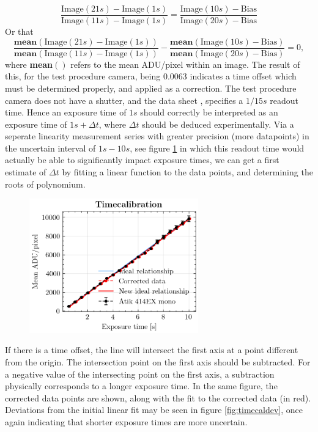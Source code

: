 \documentclass[../main.tex]{subfiles}
\begin{document}
	\begin{equation}
		\frac{\text{Image}(21s) - \text{Image}(1s)}{\text{Image}(11s) - \text{Image}(1s)} = \frac{\text{Image}(10s) - \text{Bias}}{\text{Image}(20s) - \text{Bias}}
	\end{equation}
	Or that 
	\begin{equation}
		\frac{\textbf{mean}(\text{Image}(21s) - \text{Image}(1s))}{\textbf{mean}(\text{Image}(11s) - \text{Image}(1s))} - \frac{\textbf{mean}(\text{Image}(10s) - \text{Bias})}{\textbf{mean}(\text{Image}(20s) - \text{Bias})} = 0,
	\end{equation}
	where \textbf{mean}$()$ refers to the mean ADU/pixel within an image. The result of this, for the test procedure camera, being $0.0063$ indicates a time offset which must be determined properly, and applied as a correction. The test procedure camera does not have a shutter, and the data sheet \cite{atik414specs}, specifies a $1/15 s$ readout time. Hence an exposure time of $1s$ should correctly be interpreted as an exposure time of $1s + \Delta t$, where $\Delta t$ should be deduced experimentally. Via a seperate linearity measurement series with greater precision (more datapoints) in the uncertain interval of $1s - 10s$, see figure \ref{fig:timecal} in which this readout time would actually be able to significantly impact exposure times, we can get a first estimate of $\Delta t$ by fitting a linear function to the data points, and determining the roots of polynomium. 
	\begin{figure}
		\centering			\includegraphics[width=0.65\textwidth]{time_calibration.png}
		\caption{}
		\label{fig:timecal}
	\end{figure}
	If there is a time offset, the line will intersect the first axis at a point different from the origin. The intersection point on the first axis should be subtracted. For a negative value of the intersecting point on the first axis, a subtraction physically corresponds to a longer exposure time. In the same figure, the corrected data points are shown, along with the fit to the corrected data (in red). Deviations from the initial linear fit may be seen in figure \ref{fig:timecaldev}, once again indicating that shorter exposure times are more uncertain. 
	
\end{document}

